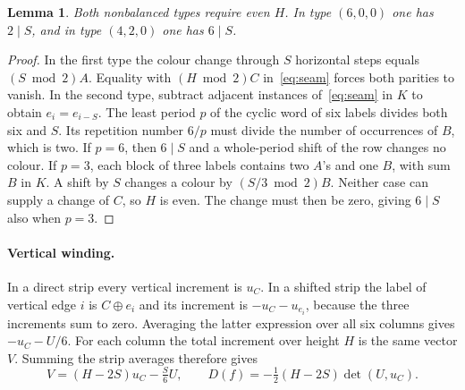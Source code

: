 \documentclass[11pt,a4paper]{article}
\newtheorem{lemma}[theorem]{Lemma}
\begin{document}
\begin{lemma}\label{lem:period}
Both nonbalanced types require even $H$. In type $(6,0,0)$ one has $2\mid S$, and in type $(4,2,0)$ one has $6\mid S$.
\end{lemma}
\begin{proof}
In the first type the colour change through $S$ horizontal steps equals $(S\bmod2)A$. Equality with $(H\bmod2)C$ in~\eqref{eq:seam} forces both parities to vanish. In the second type, subtract adjacent instances of~\eqref{eq:seam} in $K$ to obtain $e_i=e_{i-S}$. The least period $p$ of the cyclic word of six labels divides both six and $S$. Its repetition number $6/p$ must divide the number of occurrences of $B$, which is two. If $p=6$, then $6\mid S$ and a whole-period shift of the row changes no colour. If $p=3$, each block of three labels contains two $A$'s and one $B$, with sum $B$ in $K$. A shift by $S$ changes a colour by $(S/3\bmod2)B$. Neither case can supply a change of $C$, so $H$ is even. The change must then be zero, giving $6\mid S$ also when $p=3$.
\end{proof}

\paragraph{Vertical winding.}
In a direct strip every vertical increment is $u_C$. In a shifted strip the label of vertical edge $i$ is $C\oplus e_i$ and its increment is $-u_C-u_{e_i}$, because the three increments sum to zero. Averaging the latter expression over all six columns gives $-u_C-U/6$. For each column the total increment over height $H$ is the same vector $V$. Summing the strip averages therefore gives
\begin{equation}\label{eq:wind}
 V=(H-2S)u_C-\tfrac S6U,\qquad
 D(f)=-\tfrac12(H-2S)\det(U,u_C).
\end{equation}
\end{document}
